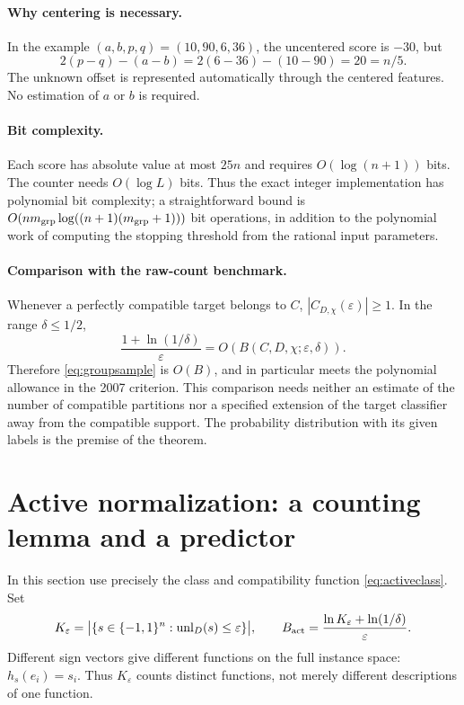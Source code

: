 \documentclass[11pt,a4paper]{article}
\theoremstyle{remark}
\newcommand{\unl}{\operatorname{unl}}
\newcommand{\1}{\mathbf 1}
\begin{document}
\paragraph{Why centering is necessary.}
In the example $(a,b,p,q)=(10,90,6,36)$, the uncentered score is $-30$, but
\[
 2(p-q)-(a-b)=2(6-36)-(10-90)=20=n/5.
\]
The unknown offset is represented automatically through the centered features.
No estimation of $a$ or $b$ is required.

\paragraph{Bit complexity.}
Each score has absolute value at most $25n$ and requires
$O(\log(n+1))$ bits. The counter needs $O(\log L)$ bits. Thus the exact
integer implementation has polynomial bit complexity; a straightforward bound
is $O(nm_{\rm grp}\log((n+1)(m_{\rm grp}+1)))$ bit operations, in addition to the polynomial
work of computing the stopping threshold from the rational input parameters.

\paragraph{Comparison with the raw-count benchmark.}
Whenever a perfectly compatible target belongs to $C$,
$|C_{D,\chi}(\varepsilon)|\ge1$. In the range $\delta\le1/2$,
\[
 \frac{1+\ln(1/\delta)}{\varepsilon}
 =O\!\left(B(C,D,\chi;\varepsilon,\delta)\right).
\]
Therefore \eqref{eq:groupsample} is $O(B)$, and in particular meets the
polynomial allowance in the 2007 criterion. This comparison needs neither
an estimate of the number of compatible partitions nor a specified extension
of the target classifier away from the compatible support. The probability
distribution with its given labels is the premise of the theorem.

\section{Active normalization: a counting lemma and a predictor}

In this section use precisely the class and compatibility function
\eqref{eq:activeclass}. Set
\[
 K_\varepsilon
 =\big|\{s\in\{-1,1\}^n:\unl_D(s)\le\varepsilon\}\big|,
 \qquad
 B_{\rm act}=\frac{\ln K_\varepsilon+\ln(1/\delta)}{\varepsilon}.
\]
Different sign vectors give different functions on the full instance space:
$h_s(e_i)=s_i$. Thus $K_\varepsilon$ counts distinct functions, not merely
different descriptions of one function.
\end{document}

